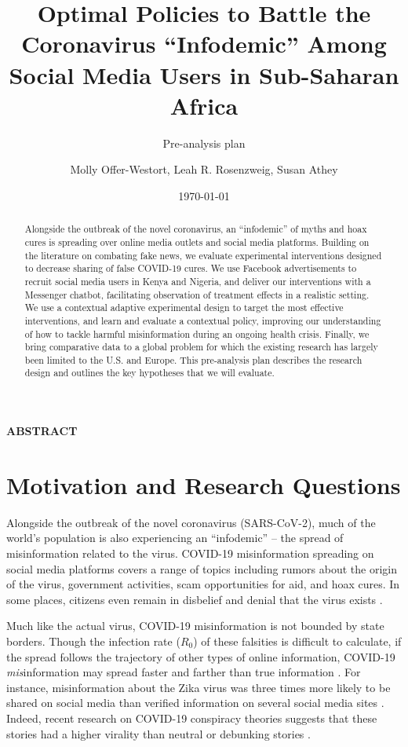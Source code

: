 \documentclass[letterpaper, 12pt, parskip=full,]{scrartcl}
\title{Optimal Policies to Battle the Coronavirus ``Infodemic'' Among Social Media Users in Sub-Saharan Africa}
\subtitle{Pre-analysis plan}
\author{Molly Offer-Westort, Leah R. Rosenzweig, Susan Athey}
\date{\today}
\begin{document}
%
\normalsize%
\maketitle%
\tableofcontents%
\clearpage%


\centerline{\textbf{ABSTRACT}}
\begin{abstract}
Alongside the outbreak of the novel coronavirus, an “infodemic” of myths and hoax cures is spreading over online media outlets and social media platforms. Building on the literature on combating fake news, we evaluate experimental interventions designed to decrease sharing of false COVID-19 cures. We use Facebook advertisements to recruit social media users in Kenya and Nigeria, and deliver our interventions with a Messenger chatbot, facilitating observation of treatment effects in a realistic setting. We use a contextual adaptive experimental design to target the most effective interventions, and learn and evaluate a contextual policy, improving our understanding of how to tackle harmful misinformation during an ongoing health crisis. Finally, we bring comparative data to a global problem for which the existing research has largely been limited to the U.S. and Europe. This pre-analysis plan describes the research design and outlines the key hypotheses that we will evaluate.
\end{abstract}





\section{Motivation and Research Questions}

Alongside the outbreak of the novel coronavirus (SARS-CoV-2), much of the world's population is also experiencing an ``infodemic'' -- the spread of misinformation related to the virus. COVID-19 misinformation spreading on social media platforms covers a range of topics including rumors about the origin of the virus, government activities, scam opportunities for aid, and hoax cures. In some places, citizens even remain in disbelief and denial that the virus exists \citep{mwaura2019why-some}. 

Much like the actual virus, COVID-19 misinformation is not bounded by state borders. Though the infection rate ($R_0$) of these falsities is difficult to calculate, if the spread follows the trajectory of other types of online information, COVID-19 \textit{mis}information may spread faster and farther than true information \citep{vosoughi2018spread}. For instance, misinformation about the Zika virus was three times more likely to be shared on social media than verified information on several social media sites \citep{sharma2017zika}. Indeed, recent research on COVID-19 conspiracy theories suggests that these stories had a higher virality than neutral or debunking stories \citep{HKS_whatsapp}. %
 
\end{document}
